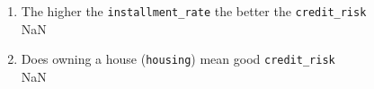 \documentclass[
]{article}
\begin{document}
\begin{enumerate}
\def\labelenumi{\arabic{enumi}.}
\setcounter{enumi}{10}
\item
  The higher the \texttt{installment\_rate} the better the \texttt{credit\_risk}\\
  NaN
\item
  Does owning a house (\texttt{housing}) mean good \texttt{credit\_risk}\\
  NaN
\end{enumerate}
\end{document}
